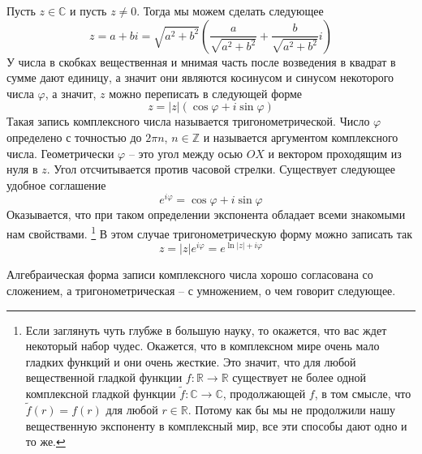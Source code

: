 Пусть $z\in\mathbb C$ и пусть $z\neq 0$.
Тогда мы можем сделать следующее
\[
z = a + bi = \sqrt{a^2 + b^2}\left(\frac{a}{\sqrt{a^2 + b^2}} + \frac{b}{\sqrt{a^2 + b^2}}i\right)
\]
У числа в скобках вещественная и мнимая часть после возведения в квадрат в сумме дают единицу, а значит они являются косинусом и синусом некоторого числа $\varphi$, а значит, $z$ можно переписать в следующей форме
\[
z = |z| (\cos \varphi + i\sin\varphi)
\]
Такая запись комплексного числа называется тригонометрической.
Число $\varphi$ определено с точностью до $2\pi n$, $n\in\mathbb Z$ и называется аргументом комплексного числа.
Геометрически $\varphi$ -- это угол между осью $OX$ и вектором проходящим из нуля в $z$.
Угол отсчитывается против часовой стрелки.
Существует следующее удобное соглашение
\[
e^{i\varphi} = \cos \varphi + i \sin \varphi
\]
Оказывается, что при таком определении экспонента обладает всеми знакомыми нам свойствами.%
\footnote{Если заглянуть чуть глубже в большую науку, то окажется, что вас ждет некоторый набор чудес.
Окажется, что в комплексном мире очень мало гладких функций и они очень жесткие.
Это значит, что для любой вещественной гладкой функции $f\colon \mathbb R\to \mathbb R$ существует не более одной комплексной гладкой функции $\tilde f\colon \mathbb C\to \mathbb C$, продолжающей $f$, в том смысле, что $\tilde f(r) = f(r)$ для любой $r\in \mathbb R$.
Потому как бы мы не продолжили нашу вещественную экспоненту в комплексный мир, все эти способы дают одно и то же.}
В этом случае тригонометрическую форму можно записать так
\[
z = |z| e^{i\varphi} = e^{\ln |z| + i\varphi}
\]

Алгебраическая форма записи комплексного числа хорошо согласована со сложением, а тригонометрическая -- с умножением, о чем говорит следующее.

